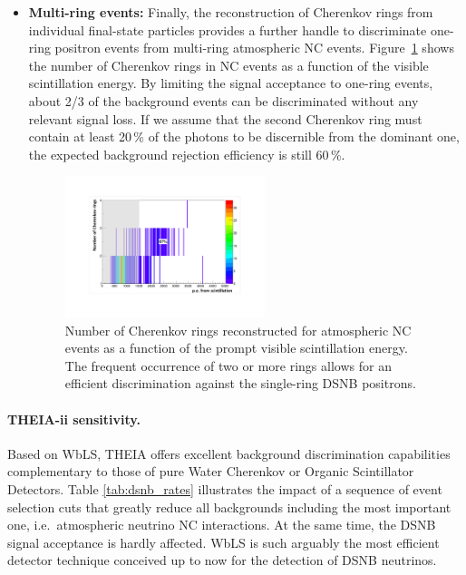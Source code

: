 \begin{itemize}
\item {\bf Multi-ring events:} Finally, the reconstruction of Cherenkov rings from individual final-state particles provides a further handle to discriminate one-ring positron events from multi-ring atmospheric NC events. Figure~\ref{fig:dsnb_multiring_disc} shows the number of Cherenkov rings in NC events as a function of the visible scintillation energy. By limiting the signal acceptance to one-ring events, about 2/3 of the background events can be discriminated without any relevant signal loss. If we assume that the second Cherenkov ring must contain at least 20\,\% of the photons to be discernible from the dominant one, the expected background rejection efficiency is still 60\,\%.
\begin{figure}[htp!]
\centering
\includegraphics[width=0.55\textwidth]{dsnb/dsnb_multiring_disc}
\caption{Number of Cherenkov rings reconstructed for atmospheric NC events as a function of the prompt visible scintillation energy. The frequent occurrence of two or more rings allows for an efficient discrimination against the single-ring DSNB positrons.}
\label{fig:dsnb_multiring_disc}
\end{figure}
\end{itemize}

\paragraph{THEIA-ii sensitivity.} Based on WbLS, THEIA offers excellent background discrimination capabilities complementary to those of pure Water Cherenkov or Organic Scintillator Detectors. Table \ref{tab:dsnb_rates} illustrates the impact of a sequence of event selection cuts that greatly reduce all backgrounds including the most important one, i.e.~atmospheric neutrino NC interactions. At the same time, the DSNB signal acceptance is hardly affected. WbLS is such arguably the most efficient detector technique conceived up to now for the detection of DSNB neutrinos.


